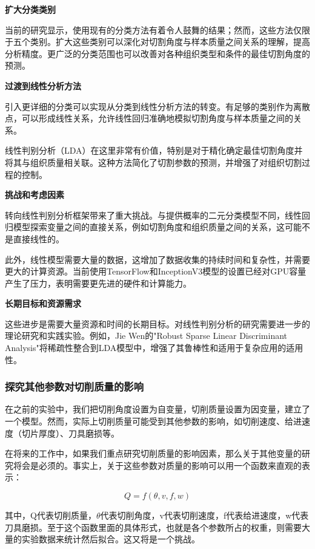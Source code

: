 \textbf{扩大分类类别}

当前的研究显示，使用现有的分类方法有着令人鼓舞的结果；然而，这些方法仅限于五个类别。扩大这些类别可以深化对切割角度与样本质量之间关系的理解，提高分析精度。更广泛的分类范围也可以改善对各种组织类型和条件的最佳切割角度的预测。

\textbf{过渡到线性分析方法}

引入更详细的分类可以实现从分类到线性分析方法的转变。有足够的类别作为离散点，可以形成线性关系，允许线性回归准确地模拟切割角度与样本质量之间的关系。

线性判别分析（LDA）在这里非常有价值，特别是对于精化确定最佳切割角度并将其与组织质量相关联。这种方法简化了切割参数的预测，并增强了对组织切割过程的控制。

\textbf{挑战和考虑因素}

转向线性判别分析框架带来了重大挑战。与提供概率的二元分类模型不同，线性回归模型探索变量之间的直接关系，例如切割角度和组织质量之间的关系，这可能不是直接线性的。

此外，线性模型需要大量的数据，这增加了数据收集的持续时间和复杂性，并需要更大的计算资源。当前使用TensorFlow和InceptionV3模型的设置已经对GPU容量产生了压力，表明需要更先进的硬件和计算能力。

\textbf{长期目标和资源需求}

这些进步是需要大量资源和时间的长期目标。对线性判别分析的研究需要进一步的理论研究和实践实验。例如，Jie Wen的"Robust Sparse Linear Discriminant Analysis"将稀疏性整合到LDA模型中，增强了其鲁棒性和适用于复杂应用的适用性\cite{6.1}。

\subsubsection{探究其他参数对切削质量的影响}

在之前的实验中，我们把切削角度设置为自变量，切削质量设置为因变量，建立了一个模型。然而，实际上切削质量可能受到其他参数的影响，如切削速度、给进速度（切片厚度）、刀具磨损等。

在将来的工作中，如果我们重点研究切削质量的影响因素，那么关于其他变量的研究将会是必须的。事实上，关于这些参数对质量的影响可以用一个函数来直观的表示：

\begin{equation}
    Q = f(\theta, v, f, w)
\end{equation}

其中，Q代表切削质量，$\theta$代表切削角度，v代表切削速度，f代表给进速度，w代表刀具磨损。至于这个函数里面的具体形式，也就是各个参数所占的权重，则需要大量的实验数据来统计然后拟合。这又将是一个挑战。


